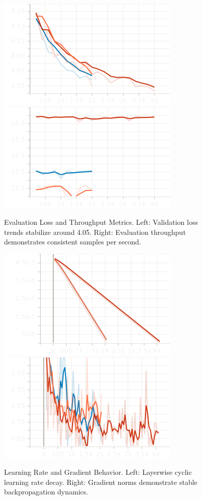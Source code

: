 \documentclass[11pt]{article}
\begin{document}
\begin{figure}[h!]
    \centering
    \includegraphics[width=0.45\linewidth]{figures/finetuning/eval_loss.png}
    \includegraphics[width=0.45\linewidth]{figures/finetuning/eval_samples_per_second.png}
    \caption{Evaluation Loss and Throughput Metrics. Left: Validation loss trends stabilize around 4.05. Right: Evaluation throughput demonstrates consistent samples per second.}
    \label{fig:eval_metrics}
\end{figure}

\begin{figure}[h!]
    \centering
    \includegraphics[width=0.45\linewidth]{figures/finetuning/train_learning_rate.png}
    \includegraphics[width=0.45\linewidth]{figures/finetuning/train_grad_norm.png}
    \caption{Learning Rate and Gradient Behavior. Left: Layerwise cyclic learning rate decay. Right: Gradient norms demonstrate stable backpropagation dynamics.}
    \label{fig:learning_rate_grad}
\end{figure}
\end{document}
